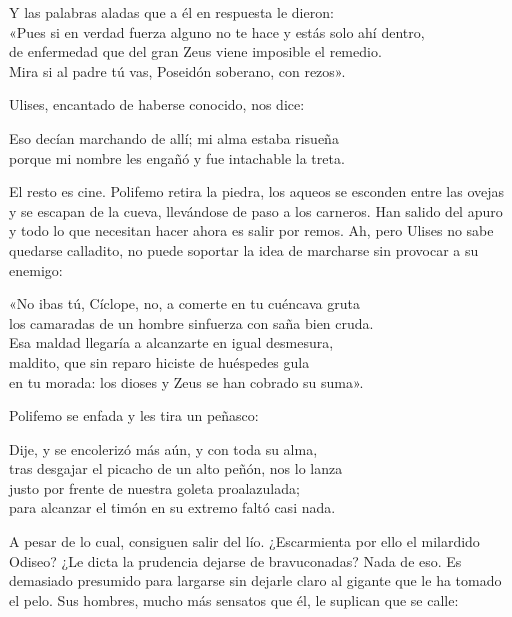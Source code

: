 \begin{versocita}
Y las palabras aladas que a él en respuesta le dieron:\\
«Pues si en verdad fuerza alguno no te hace y estás solo ahí dentro,\\
de enfermedad que del gran Zeus viene imposible el remedio.\\
Mira si al padre tú vas, Poseidón soberano, con rezos».
\end{versocita}

Ulises, encantado de haberse conocido, nos dice:

\begin{versocita}
Eso decían marchando de allí; mi alma estaba risueña\\
porque mi nombre les engañó y fue intachable la treta.
\end{versocita}

El resto es cine. Polifemo retira la piedra, los aqueos se esconden entre las ovejas y se escapan de la cueva, llevándose de paso a los carneros. Han salido del apuro y todo lo que necesitan hacer ahora es salir por remos. Ah, pero Ulises no sabe quedarse calladito, no puede soportar la idea de marcharse sin provocar a su enemigo:

\begin{versocita}
«No ibas tú, Cíclope, no, a comerte en tu cuéncava gruta\\
los camaradas de un hombre sinfuerza con saña bien cruda.\\
Esa maldad llegaría a alcanzarte en igual desmesura,\\
maldito, que sin reparo hiciste de huéspedes gula\\
en tu morada: los dioses y Zeus se han cobrado su suma».
\end{versocita}

Polifemo se enfada y les tira un peñasco:

\begin{versocita}
Dije, y se encolerizó más aún, y con toda su alma,\\
tras desgajar el picacho de un alto peñón, nos lo lanza\\
justo por frente de nuestra goleta proalazulada;\\
para alcanzar el timón en su extremo faltó casi nada.
\end{versocita}

A pesar de lo cual, consiguen salir del lío. ¿Escarmienta por ello el milardido Odiseo? ¿Le dicta la prudencia dejarse de bravuconadas? Nada de eso. Es demasiado presumido para largarse sin dejarle claro al gigante que le ha tomado el pelo.
Sus hombres, mucho más sensatos que él, le suplican que se calle:

